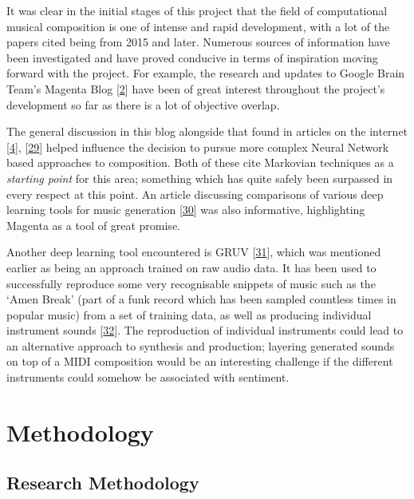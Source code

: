 \documentclass[12pt,]{article}
\begin{document}
It was clear in the initial stages of this project that the field of
computational musical composition is one of intense and rapid
development, with a lot of the papers cited being from 2015 and later.
Numerous sources of information have been investigated and have proved
conducive in terms of inspiration moving forward with the project. For
example, the research and updates to Google Brain Team's Magenta Blog
{[}\protect\hyperlink{ref-magenta}{2}{]} have been of great interest
throughout the project's development so far as there is a lot of
objective overlap.

The general discussion in this blog alongside that found in articles on
the internet {[}\protect\hyperlink{ref-mediumkylemcdonald}{4}{]},
{[}\protect\hyperlink{ref-mkofler}{29}{]} helped influence the decision
to pursue more complex Neural Network based approaches to composition.
Both of these cite Markovian techniques as a \emph{starting point} for
this area; something which has quite safely been surpassed in every
respect at this point. An article discussing comparisons of various deep
learning tools for music generation
{[}\protect\hyperlink{ref-asimovinst}{30}{]} was also informative,
highlighting Magenta as a tool of great promise.

Another deep learning tool encountered is GRUV
{[}\protect\hyperlink{ref-nayebi2015gruv}{31}{]}, which was mentioned
earlier as being an approach trained on raw audio data. It has been used
to successfully reproduce some very recognisable snippets of music such
as the `Amen Break' (part of a funk record which has been sampled
countless times in popular music) from a set of training data, as well
as producing individual instrument sounds
{[}\protect\hyperlink{ref-fiala}{32}{]}. The reproduction of individual
instruments could lead to an alternative approach to synthesis and
production; layering generated sounds on top of a MIDI composition would
be an interesting challenge if the different instruments could somehow
be associated with sentiment.

\hypertarget{methodology}{%
\section{Methodology}\label{methodology}}

\hypertarget{research-methodology}{%
\subsection{Research Methodology}\label{research-methodology}}
\end{document}
